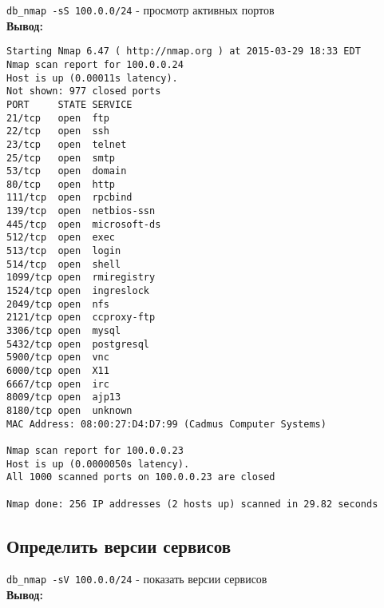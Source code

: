 \documentclass[12pt,a4paper]{article}
\begin{document}
\verb+db_nmap -sS 100.0.0/24+ - просмотр активных портов\\

\textbf{Вывод:}

\begin{lstlisting}
Starting Nmap 6.47 ( http://nmap.org ) at 2015-03-29 18:33 EDT
Nmap scan report for 100.0.0.24
Host is up (0.00011s latency).
Not shown: 977 closed ports
PORT     STATE SERVICE
21/tcp   open  ftp
22/tcp   open  ssh
23/tcp   open  telnet
25/tcp   open  smtp
53/tcp   open  domain
80/tcp   open  http
111/tcp  open  rpcbind
139/tcp  open  netbios-ssn
445/tcp  open  microsoft-ds
512/tcp  open  exec
513/tcp  open  login
514/tcp  open  shell
1099/tcp open  rmiregistry
1524/tcp open  ingreslock
2049/tcp open  nfs
2121/tcp open  ccproxy-ftp
3306/tcp open  mysql
5432/tcp open  postgresql
5900/tcp open  vnc
6000/tcp open  X11
6667/tcp open  irc
8009/tcp open  ajp13
8180/tcp open  unknown
MAC Address: 08:00:27:D4:D7:99 (Cadmus Computer Systems)

Nmap scan report for 100.0.0.23
Host is up (0.0000050s latency).
All 1000 scanned ports on 100.0.0.23 are closed

Nmap done: 256 IP addresses (2 hosts up) scanned in 29.82 seconds
\end{lstlisting}
\newpage
\subsection{Определить версии сервисов}
\verb+db_nmap -sV 100.0.0/24+ - показать версии сервисов\\

\textbf{Вывод:}
\end{document}
